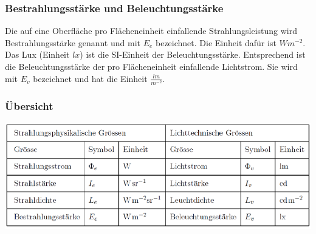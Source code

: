 \subsubsection{Bestrahlungsstärke und Beleuchtungsstärke}
Die auf eine Oberfläche pro Flächeneinheit einfallende Strahlungsleistung wird Bestrahlungsstärke
genannt und mit $E_e$ bezeichnet. Die Einheit dafür ist $Wm^{-2}$. \\
Das Lux (Einheit $lx$) ist die SI-Einheit der Beleuchtungsstärke. Entsprechend ist die Beleuchtungsstärke der pro Flächeneinheit einfallende Lichtstrom. Sie wird mit $E_v$ bezeichnet und hat die Einheit $\frac{lm}{m^{−2}}$.

\subsubsection{Übersicht}
\includegraphics[width=1\textwidth]{images/uebersicht_licht} 